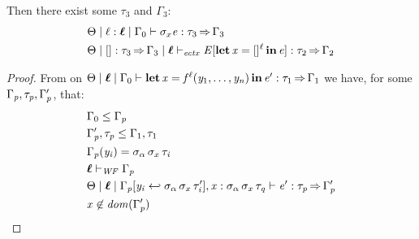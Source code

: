 \begin{lemma}
  Then there exist some $\tau_{{\mathrm{3}}}$ and $\Gamma_{{\mathrm{3}}}$:
  \begin{align*}
    &  \Theta   \mid   \ell  \ottsym{:}  \oldvec{\ell}   \mid   \Gamma_{{\mathrm{0}}}   \vdash    \sigma_{x}   \ottnt{e}   :  \tau_{{\mathrm{3}}}   \produces   \Gamma_{{\mathrm{3}}}  \\
    & \Theta  \mid  \HOLE  \ottsym{:}  \tau_{{\mathrm{3}}}  \produces  \Gamma_{{\mathrm{3}}}  \mid  \oldvec{\ell}  \vdash_{\mathit{ectx} }   \ottnt{E} [\LET  \mathit{x}  =   \HOLE^ \ell   \IN  \ottnt{e}  ]   \ottsym{:}  \tau_{{\mathrm{2}}}  \produces  \Gamma_{{\mathrm{2}}}
  \end{align*}
\end{lemma}
\begin{proof}
  From  on
  $ \Theta   \mid   \oldvec{\ell}   \mid   \Gamma_{{\mathrm{0}}}   \vdash    \LET  \mathit{x}  =   \mathit{f} ^ \ell (  \mathit{y_{{\mathrm{1}}}} ,\ldots, \mathit{y_{\ottmv{n}}}  )   \IN  \ottnt{e'}   :  \tau_{{\mathrm{1}}}   \produces   \Gamma_{{\mathrm{1}}} $ we have, for some
  $\Gamma_{\mathit{p}}, \tau_{\mathit{p}}, \Gamma'_{\mathit{p}}$, that:
  \begin{align}
    & \Gamma_{{\mathrm{0}}}  \leq  \Gamma_{\ottmv{p}} \label{eqn:in-sub} \\
    & \Gamma'_{\ottmv{p}}  \ottsym{,}  \tau_{\ottmv{p}}  \leq  \Gamma_{{\mathrm{1}}}  \ottsym{,}  \tau_{{\mathrm{1}}} \label{eqn:out-sub} \\
    & \Gamma_{\ottmv{p}}  \ottsym{(}  \mathit{y_{\ottmv{i}}}  \ottsym{)}  \ottsym{=}  \sigma_{\alpha} \, \sigma_{x} \, \tau_{\ottmv{i}} \label{eqn:arg-typed} \\
    &  \oldvec{\ell}   \vdash _{\wf}  \Gamma_{\ottmv{p}}  \label{eqn:sub-in-env-wf} \\
    &  \Theta   \mid   \oldvec{\ell}   \mid   \Gamma_{\ottmv{p}}  \ottsym{[}  \mathit{y_{\ottmv{i}}}  \hookleftarrow  \sigma_{\alpha} \, \sigma_{x} \, \tau'_{\ottmv{i}}  \ottsym{]}  \ottsym{,}  \mathit{x}  \ottsym{:}  \sigma_{\alpha} \, \sigma_{x} \, \tau_{\ottmv{q}}   \vdash   \ottnt{e'}  :  \tau_{\ottmv{p}}   \produces   \Gamma'_{\ottmv{p}}  \label{eqn:let-body-well-typed} \\
    &  \mathit{x}  \not\in   \DOM( \Gamma'_{\ottmv{p}} )   \label{eqn:cbind-erased}
  \end{align}
  

\end{proof}
